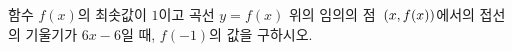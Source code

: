 함수 $f(x)$의 최솟값이 $1$이고 곡선 $y=f(x)$ 위의 임의의 점~$(x{,}\mkern3mu\mathopen{}f(x))$에서의 접선의 기울기가 $6x-6$일 때, $f(-1)$의 값을 구하시오.

